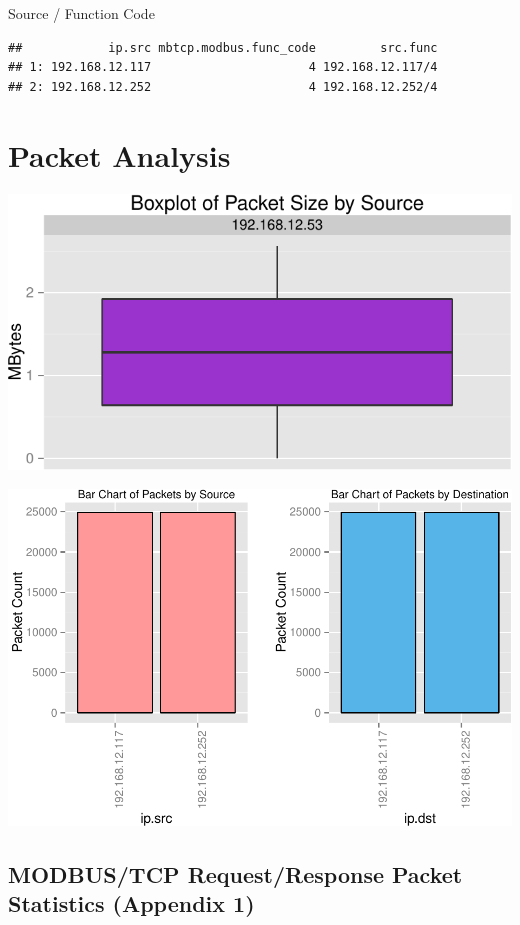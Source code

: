 \documentclass[]{article}
\begin{document}
Source / Function Code

\begin{verbatim}
##            ip.src mbtcp.modbus.func_code         src.func
## 1: 192.168.12.117                      4 192.168.12.117/4
## 2: 192.168.12.252                      4 192.168.12.252/4
\end{verbatim}

\section{Packet Analysis}\label{packet-analysis}

\begin{center}\includegraphics{modbus_files/figure-latex/unnamed-chunk-9-1} \end{center}

\includegraphics{modbus_files/figure-latex/unnamed-chunk-10-1.pdf}

\pagebreak

\subsection{MODBUS/TCP Request/Response Packet Statistics (Appendix
1)}\label{modbustcp-requestresponse-packet-statistics-appendix-1}
\end{document}
